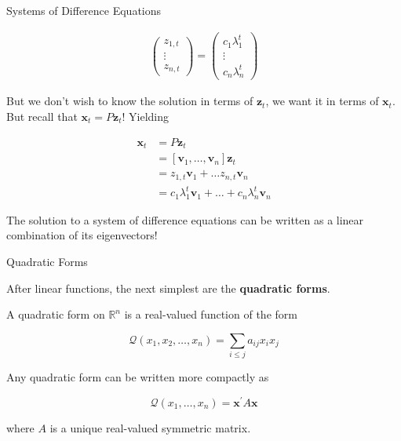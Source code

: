 \documentclass[11pt, xcolor={dvipsnames}, hyperref={colorlinks, allcolors=Blue}]{beamer}
\newcommand\bc[1]{{\usebeamercolor[fg]{frametitle} {\textbf{#1}}}} %
\newcommand{\R}{\mathbb{R}}
\newcommand{\x}{\mathbf{x}}
\newcommand{\z}{\mathbf{z}}
\renewcommand{\v}{\mathbf{v}}
\begin{document}
\begin{frame}{Systems of Difference Equations}

\begin{align*}
\begin{pmatrix} z_{1,t} \\ \vdots \\ z_{n,t} \end{pmatrix}
=
\begin{pmatrix} c_1 \lambda_1^t \\ \vdots \\ c_n \lambda_n^t\end{pmatrix}
\end{align*}

But we don't wish to know the solution in terms of $\z_t$, we want it in terms of $\x_t$. But recall that $\x_t = P\z_t$! Yielding

\begin{align*}
\x_t &= P\z_t\\
&= [\v_1, \dots, \v_n] \z_t\\
&= z_{1,t} \v_1 + \dots z_{n,t} \v_n\\
&= c_1 \lambda_1^t \v_1 + \dots + c_n \lambda_n^t \v_n
\end{align*}

The solution to a system of difference equations can be written as a linear combination of its eigenvectors!

\end{frame}

\begin{frame}{Quadratic Forms}

After linear functions, the next simplest are the \bc{quadratic forms}. 

A quadratic form on $\R^{n}$ is a real-valued function of the form\bigskip

\[\mathcal{Q}(x_{1},x_{2},\dots, x_{n}) = \sum_{i \leq j} a_{ij}x_{i}x_{j}\]
\bigskip

Any quadratic form can be written more compactly as
\bigskip

\[\mathcal{Q}(x_{1},\dots,x_{n}) = \x^{'}A\x\]
\bigskip

where $A$ is a unique real-valued symmetric matrix.

\end{frame}
\end{document}
